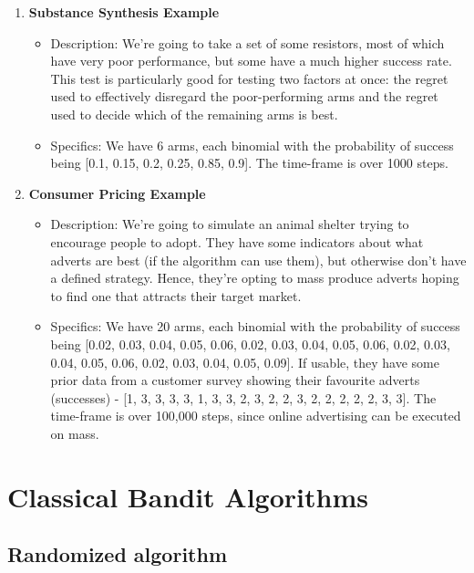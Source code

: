 \begin{enumerate}
    \item \textbf{Substance Synthesis Example}
    \begin{itemize}
        \item Description: We're going to take a set of some resistors, most of which have very poor performance, but some have a much higher success rate. This test is particularly good for testing two factors at once: the regret used to effectively disregard the poor-performing arms and the regret used to decide which of the remaining arms is best.
        \item Specifics: We have 6 arms, each binomial with the probability of success being [0.1, 0.15, 0.2, 0.25, 0.85, 0.9]. The time-frame is over 1000 steps.
    \end{itemize}
    
    \item \textbf{Consumer Pricing Example}
    \begin{itemize}
        \item Description: We're going to simulate an animal shelter trying to encourage people to adopt. They have some indicators about what adverts are best (if the algorithm can use them), but otherwise don't have a defined strategy. Hence, they're opting to mass produce adverts hoping to find one that attracts their target market.
        \item Specifics: We have 20 arms, each binomial with the probability of success being [0.02, 0.03, 0.04, 0.05, 0.06, 0.02, 0.03, 0.04, 0.05, 0.06, 0.02, 0.03, 0.04, 0.05, 0.06, 0.02, 0.03, 0.04, 0.05, 0.09]. If usable, they have some prior data from a customer survey showing their favourite adverts (successes) - [1, 3, 3, 3, 3, 1, 3, 3, 2, 3, 2, 2, 3, 2, 2, 2, 2, 2, 3, 3]. The time-frame is over 100,000 steps, since online advertising can be executed on mass.
    \end{itemize}
\end{enumerate}



\section{Classical Bandit Algorithms}


\subsection{Randomized algorithm}

